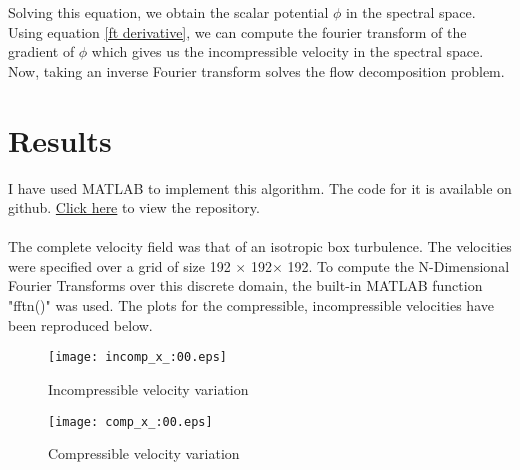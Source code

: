 \documentclass[12pt, a4paper]{report}
\begin{document}
Solving this equation, we obtain the scalar potential $\phi$ in the spectral space. Using equation \ref{ft derivative}, we can compute the fourier transform of the gradient of $\phi$ which gives us the incompressible velocity in the spectral space. Now, taking an inverse Fourier transform solves the flow decomposition problem.

\section{Results}
I have used MATLAB to implement this algorithm. The code for it is available on github. \href{https://github.com/harish-96/SLP}{Click here} to view the repository.\\~\\
The complete velocity field was that of an isotropic box turbulence. The velocities were specified over a grid of size 192 $\times$ 192$\times$ 192. To compute the N-Dimensional Fourier Transforms over this discrete domain, the built-in MATLAB function "fftn()" was used. The plots for the compressible, incompressible velocities have been reproduced below.
\begin{figure}[h]
    \centering
    \texttt{[image: incomp\_x\_:00.eps]}
    \caption{Incompressible velocity variation}
    \label{fig:incomp_x}
\end{figure}
\begin{figure}[h]
    \centering
    \texttt{[image: comp\_x\_:00.eps]}
    \caption{Compressible velocity variation}
    \label{fig:comp_x}
\end{figure}
% 
%
%


\end{document}
